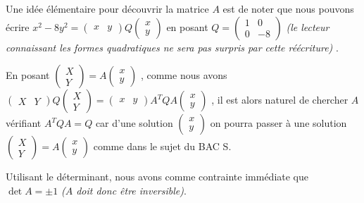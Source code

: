 Une idée élémentaire pour découvrir la matrice  $A$ est de noter que nous pouvons écrire
$x^2 - 8 y^2
=
\begin{pmatrix} 
  x & y 
\end{pmatrix}
Q
\begin{pmatrix} 
  x \\ 
  y 
\end{pmatrix}$
en posant
$Q
=
\begin{pmatrix} 
  1 & 0  \\ 
  0 & -8 
\end{pmatrix}$ 
\textit{
	(le lecteur connaissant les formes quadratiques ne sera pas surpris par cette réécriture) 
}.


\medskip

En posant 
$\begin{pmatrix} 
  X \\ 
  Y 
\end{pmatrix}
=
A
\begin{pmatrix} 
  x \\ 
  y 
\end{pmatrix}$ ,
comme nous avons
$\begin{pmatrix} 
  X & Y 
\end{pmatrix}
Q
\begin{pmatrix} 
  X \\ 
  Y 
\end{pmatrix}
=
\begin{pmatrix} 
  x & y 
\end{pmatrix}
A^T Q A
\begin{pmatrix} 
  x \\ 
  y 
\end{pmatrix}$ ,
il est alors naturel de chercher $A$ vérifiant $A^T Q A = Q$ car d'une solution
$\begin{pmatrix} 
  x \\ 
  y 
\end{pmatrix}$
on pourra passer à une  solution
$\begin{pmatrix} 
  X \\ 
  Y 
\end{pmatrix}
=
A \begin{pmatrix} 
  x \\ 
  y 
\end{pmatrix}$
comme dans le sujet du BAC S.


\bigskip

Utilisant le déterminant, nous avons comme contrainte immédiate que $\det A = \pm 1$ \textit{($A$ doit donc être inversible)}. 


